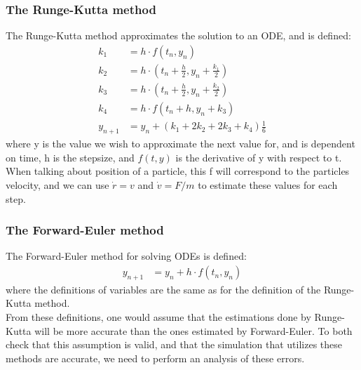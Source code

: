 \documentclass[english,notitlepage,reprint,nofootinbib,twocolumn]{article}
\begin{document}
\subsubsection{The Runge-Kutta method}
The Runge-Kutta method approximates the solution to an ODE, and is defined: 
\begin{align*}
k_1 &= h \cdot f(t_n, y_n) \\
k_2 &= h \cdot (t_n + \frac{h}{2}, y_n + \frac{k_1}{2}) \\
k_3 &= h \cdot (t_n + \frac{h}{2}, y_n + \frac{k_2}{2}) \\
k_4 &= h \cdot f(t_n + h, y_n + k_3) \\
y_{n+1} &= y_n + (k_1 + 2k_2 + 2k_3 + k_4)\frac{1}{6}
\end{align*}
where y is the value we wish to approximate the next value for, and is dependent on time, h is the stepsize, and $f(t, y)$ is the derivative of y with respect to t. When talking about position of a particle, this f will correspond to the particles velocity, and we can use $\dot{r}=v$ and $\dot{v}=F/m$ to estimate these values for each step. \\

\subsubsection{The Forward-Euler method}
The Forward-Euler method for solving ODEs is defined:
\begin{align*}
y_{n+1} &= y_n + h \cdot f(t_n, y_n)
\end{align*}
where the definitions of variables are the same as for the definition of the Runge-Kutta method.\\

From these definitions, one would assume that the estimations done by Runge-Kutta will be more accurate than the ones estimated by Forward-Euler. To both check that this assumption is valid, and that the simulation that utilizes these methods are accurate, we need to perform an analysis of these errors. 
\end{document}
